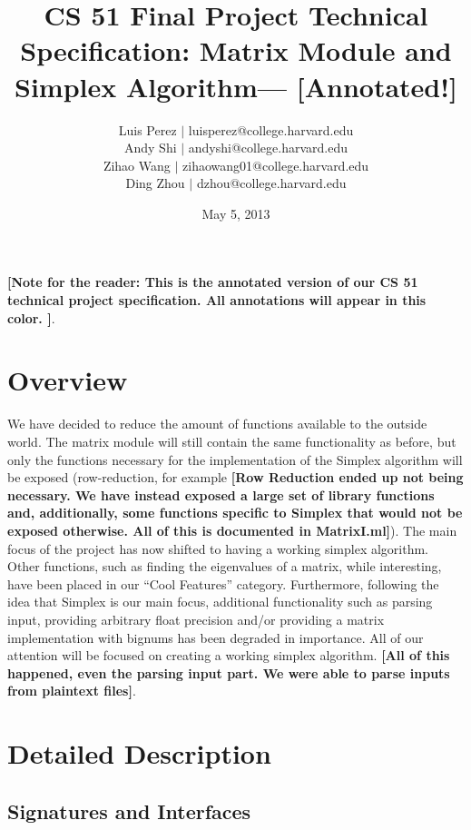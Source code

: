 \documentclass[letterpaper,11pt]{article}
\newcommand{\annot}[1]{\textbf{\color{BrickRed} [#1]}}
\begin{document}
\title{CS 51 Final Project Technical Specification: Matrix Module and Simplex Algorithm---{\annot{Annotated!}}}
\author{
Luis Perez $|$ luisperez@college.harvard.edu \\ 
Andy Shi $|$ andyshi@college.harvard.edu \\ 
Zihao Wang $|$ zihaowang01@college.harvard.edu \\ 
Ding Zhou $|$ dzhou@college.harvard.edu
}
\date{May 5, 2013}
\maketitle

{\annot{Note for the reader: This is the annotated version of our CS 51 
technical project specification. All annotations will appear in this color. }}.

\section{Overview}

We have decided to reduce the amount of functions available to the outside
world. The matrix module will still contain the same functionality as before,
but only the functions necessary for the implementation of the Simplex algorithm
will be exposed (row-reduction, for example{\annot{Row Reduction ended up not
being necessary. We have instead exposed a large set of library functions and,
additionally, some functions specific to Simplex that would not be exposed otherwise.
All of this is documented in MatrixI.ml}}). The main focus of the project has
now shifted to having a working simplex algorithm. Other functions, such as
finding the eigenvalues of a matrix, while interesting, have been placed in our
``Cool Features'' category. Furthermore, following the idea that Simplex is our
main focus, additional functionality such as parsing input, providing arbitrary
float precision and/or providing a matrix implementation with bignums has been
degraded in importance. All of our attention will be focused on creating a
working simplex algorithm. {\annot{All of this happened, even the parsing input part. 
We were able to parse inputs from plaintext files}}.

\section{Detailed Description}
\subsection{Signatures and Interfaces}
\end{document}
